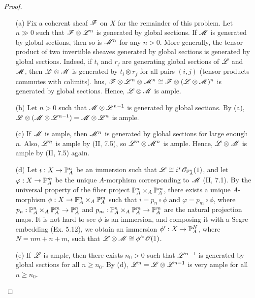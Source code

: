 \documentclass{article}
\begin{document}
\begin{enumerate} [label=\textbf{\arabic*.}, leftmargin=-0em]
\begin{proof} $ $ \vspace{0pt}
\begin{itemize} [leftmargin=0cm]
\item[(a)] Fix a coherent sheaf $\mathscr{F}$ on $X$ for the remainder of this problem. Let $n \gg 0$ such that $\mathscr{F} \otimes \mathscr{L}^n$ is generated by global sections.
If $\mathscr{M}$ is generated by global sections, then so is $\mathscr{M}^n$ for any $n > 0$.
More generally, the tensor product of two invertible sheaves generated by global sections is generated by global sections.
Indeed, if $t_i$ and $r_j$ are generating global sections of $\mathscr{L}$ and $\mathscr{M}$, then $\mathscr{L} \otimes \mathscr{M}$ is generated by $t_i \otimes r_j$ for all pairs $(i, j)$ (tensor products commutes with colimits). 
hus, $\mathscr{F} \otimes \mathscr{L}^n \otimes \mathscr{M}^n \cong \mathscr{F} \otimes (\mathscr{L} \otimes \mathscr{M})^n$ is generated by global sections. Hence, $\mathscr{L} \otimes \mathscr{M}$ is ample.

\item[(b)] Let $n > 0$ such that $\mathscr{M} \otimes \mathscr{L}^{n - 1}$ is generated by global sections. By (a), $\mathscr{L} \otimes (\mathscr{M} \otimes \mathscr{L}^{n - 1}) = \mathscr{M} \otimes \mathscr{L}^n$ is ample.

\item[(c)] If $\mathscr{M}$ is ample, then $\mathscr{M}^n$ is generated by global sections for large enough $n$. Also, $\mathscr{L}^n$ is ample by (II, 7.5), so $\mathscr{L}^n \otimes \mathscr{M}^n$ is ample. Hence, $\mathscr{L} \otimes \mathscr{M}$ is ample by (II, 7.5) again.

\item[(d)] Let $i : X \to \mathbb{P}_A^n$ be an immersion such that $\mathscr{L} \cong i^*\mathscr{O}_{\mathbb{P}_A^n}(1)$, and let $\varphi : X \to \mathbb{P}_A^m$ be the unique $A$-morphism corresponding to $\mathscr{M}$ (II, 7.1).
By the universal property of the fiber project $\mathbb{P}_A^n \times_A \mathbb{P}_A^m$, there exists a unique $A$-morphism $\phi : X \to \mathbb{P}_A^n \times_A \mathbb{P}_A^m$ such that $i = p_n \circ \phi$ and $\varphi = p_m \circ \phi$, where $p_n : \mathbb{P}_A^n \times_A \mathbb{P}_A^m \to \mathbb{P}_A^n$ and $p_m : \mathbb{P}_A^n \times_A \mathbb{P}_A^m \to \mathbb{P}_A^m$ are the natural projection maps.
It is not hard to see $\phi$ is an immersion, and composing it with a Segre embedding (Ex. 5.12), we obtain an immersion $\phi' : X \to \mathbb{P}_A^N$, where $N = nm + n + m$, such that $\mathscr{L} \otimes \mathscr{M} \cong \phi'^* \mathscr{O}(1)$.

\item[(e)] If $\mathscr{L}$ is ample, then there exists $n_0 > 0$ such that $\mathscr{L}^{n - 1}$ is generated by global sections for all $n \geq n_0$. By (d), $\mathscr{L}^n = \mathscr{L} \otimes \mathscr{L}^{n - 1}$ is very ample for all $n \geq n_0$.
\end{itemize} 
\end{proof}

\end{enumerate}
\end{document}

